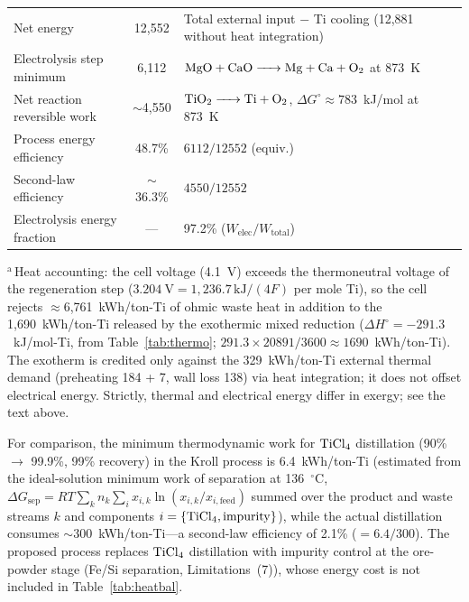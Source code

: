 \documentclass[11pt]{article}
\begin{document}
\begin{table}[!ht]
\begin{tabularx}{\linewidth}{l c X}
\quad Net energy & 12{,}552 & Total external input $-$ Ti cooling (12{,}881 without heat integration) \\
\quad Electrolysis step minimum & 6{,}112 & $\ce{MgO + CaO -> Mg + Ca + O2}$ at 873~K \\
\quad Net reaction reversible work & $\sim$4{,}550 & $\ce{TiO2 -> Ti + O2}$, $\Delta G^{\circ}\approx783$~kJ/mol at 873~K \\
\quad Process energy efficiency & 48.7\% & $6112/12552$ (equiv.) \\
\quad Second-law efficiency & $\sim$36.3\% & $4550/12552$ \\
\quad Electrolysis energy fraction & --- & 97.2\% ($W_{\mathrm{elec}}/W_{\mathrm{total}}$) \\
\bottomrule
\end{tabularx}

\par\footnotesize $^{\mathrm{a}}$\,Heat accounting: the cell voltage (4.1~V) exceeds the thermoneutral voltage of the regeneration step ($3.204~\mathrm{V} = 1{,}236.7\,\mathrm{kJ}/(4F)$ per mole Ti), so the cell rejects $\approx$6{,}761~kWh/ton-Ti of ohmic waste heat in addition to the 1{,}690~kWh/ton-Ti released by the exothermic mixed reduction ($\Delta H^{\circ} = -291.3$~kJ/mol-Ti, from Table~\ref{tab:thermo}; $291.3 \times 20891 / 3600 \approx 1690$~kWh/ton-Ti). The exotherm is credited only against the 329~kWh/ton-Ti external thermal demand (preheating 184 + 7, wall loss 138) via heat integration; it does not offset electrical energy. Strictly, thermal and electrical energy differ in exergy; see the text above.
\end{table}

For comparison, the minimum thermodynamic work for $\ce{TiCl4}$ distillation (90\% $\to$ 99.9\%, 99\% recovery) in the Kroll process is 6.4~kWh/ton-Ti (estimated from the ideal-solution minimum work of separation at 136~$^{\circ}$C, $\Delta G_{\mathrm{sep}} = RT \sum_k n_k \sum_i x_{i,k}\ln(x_{i,k}/x_{i,\mathrm{feed}})$ summed over the product and waste streams $k$ and components $i = \{\ce{TiCl4}, \mathrm{impurity}\}$), while the actual distillation consumes $\sim$300~kWh/ton-Ti---a second-law efficiency of 2.1\% ($= 6.4/300$). The proposed process replaces $\ce{TiCl4}$ distillation with impurity control at the ore-powder stage (Fe/Si separation, Limitations~(7)), whose energy cost is not included in Table~\ref{tab:heatbal}.
\end{document}
